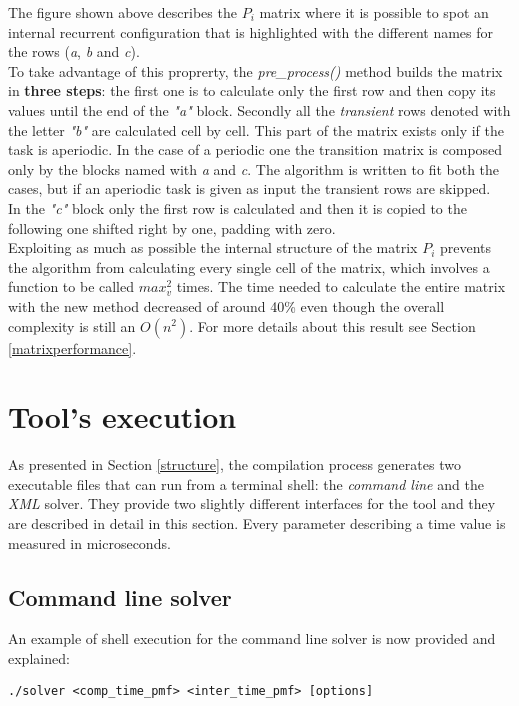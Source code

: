 The figure shown above describes the \( P_{i} \) matrix where it is possible to spot an internal recurrent configuration that is highlighted with the different names for the rows (\emph{a}, \emph{b} and \emph{c}).\\
To take advantage of this proprerty, the \emph{pre\_process()} method builds the matrix in \textbf{three steps}: the first one is to calculate only the first row and then copy its values until the end of the \emph{"a"} block. Secondly all the \emph{transient} rows denoted with the letter \emph{"b"} are calculated cell by cell. This part of the matrix exists only if the task is aperiodic. In the case of a periodic one the transition matrix is composed only by the blocks named with \emph{a} and \emph{c}. The algorithm is written to fit both the cases, but if an aperiodic task is given as input the transient rows are skipped.\\
In the \emph{"c"} block only the first row is calculated and then it is copied to the following one shifted right by one, padding with zero.\\
Exploiting as much as possible the internal structure of the matrix \( P_{i} \) prevents the algorithm from calculating every single cell of the matrix, which involves a function to be called \( max_{v}^{2} \) times. The time needed to calculate the entire matrix with the new method decreased of around 40\% even though the overall complexity is still an \( O(n^{2}) \). For more details about this result see Section \ref{matrixperformance}.

\section{Tool's execution}
As presented in Section \ref{structure}, the compilation process generates two executable files that can run from a terminal shell: the \emph{command line} and the \emph{XML} solver. They provide two slightly different interfaces for the tool and they are described in detail in this section. Every parameter describing a time value is measured in microseconds.

\subsection{Command line solver}
An example of shell execution for the command line solver is now provided and explained:
\begin{lstlisting}[frame=bt, numbers=none]
  ./solver <comp_time_pmf> <inter_time_pmf> [options]
\end{lstlisting}    

